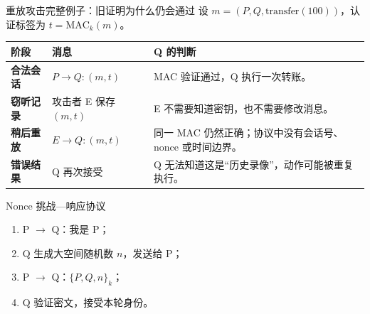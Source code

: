 \documentclass[UTF8,fontset=none,aspectratio=169,10pt]{beamer}
\begin{document}
\begin{frame}{重放攻击完整例子：旧证明为什么仍会通过}
\small
设 $m=(P,Q,\mathrm{transfer}(100))$，认证标签为 $t=\mathrm{MAC}_k(m)$。
\begin{center}
\begin{tabularx}{.96\linewidth}{>{\bfseries}p{1.5cm}p{3.5cm}X}
\toprule
阶段 & 消息 & Q 的判断 \\
\midrule
合法会话 & $P\rightarrow Q:(m,t)$ & MAC 验证通过，Q 执行一次转账。 \\
窃听记录 & 攻击者 E 保存 $(m,t)$ & E 不需要知道密钥，也不需要修改消息。 \\
稍后重放 & $E\rightarrow Q:(m,t)$ & 同一 MAC 仍然正确；协议中没有会话号、nonce 或时间边界。 \\
错误结果 & Q 再次接受 & Q 无法知道这是“历史录像”，动作可能被重复执行。 \\
\bottomrule
\end{tabularx}
\end{center}
\end{frame}

\begin{frame}{Nonce 挑战—响应协议}
\begin{enumerate}
  \item P $\rightarrow$ Q：我是 P；
  \item Q 生成大空间随机数 $n$，发送给 P；
  \item P $\rightarrow$ Q：$\{P,Q,n\}_k$；
  \item Q 验证密文，接受本轮身份。
\end{enumerate}
\begin{center}
\end{center}
\end{frame}
\end{document}
